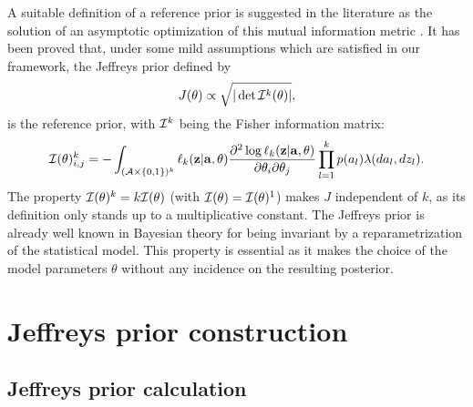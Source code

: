     A suitable definition of a reference prior is suggested in the literature as the solution of an asymptotic optimization of this mutual information metric \cite{Berger2009, Clarke1994}.
    It has been proved that, under some mild assumptions which are satisfied in our framework, the Jeffreys prior defined by  
       \begin{equation}
        J(\theta)\propto\sqrt{|\det\mathcal{I}^k(\theta)|} ,
         \label{uncIM:eq:jeff}
    \end{equation}
    is the reference prior, with $\mathcal{I}^k$ being the Fisher information matrix:
    \begin{equation}
        \mathcal{I}(\theta)^k_{i,j}
            = -\int_{(\mathcal{A} \times \{0,1\})^k} \ell_k(\mathbf{z}|\mathbf{a},\theta)\frac{\partial^2 \log \ell_k(\mathbf{z}|\mathbf{a},\theta)}{\partial\theta_i\partial \theta_j}\prod_{l=1}^kp(a_l) \lambda(da_l,dz_l).
    \end{equation}
    The property $\mathcal{I}(\theta)^k=k\mathcal{I}(\theta)$ (with $\mathcal{I}(\theta)=\mathcal{I}(\theta)^1$) makes $J$ independent of $k$, as its definition only stands up to a multiplicative constant.
    The Jeffreys prior is already well known in Bayesian theory for being invariant by a reparametrization of the statistical model.
    This property is essential as it makes the choice of the model parameters $\theta$ without any incidence on the resulting posterior.
    
\section{Jeffreys prior construction}  \label{uncIM:sec:construction}

    \subsection{Jeffreys prior calculation} \label{uncIM:sec:jeffcalc}
    
